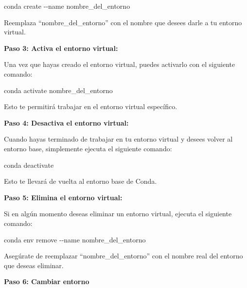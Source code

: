 \documentclass[
  jou,
  floatsintext,
  longtable,
  a4paper,
  nolmodern,
  notxfonts,
  notimes,
  colorlinks=true,linkcolor=blue,citecolor=blue,urlcolor=blue]{apa7}
\newenvironment{Shaded}{\begin{snugshade}}{\end{snugshade}}
\newcommand{\AttributeTok}[1]{\textcolor[rgb]{0.40,0.45,0.13}{#1}}
\newcommand{\ExtensionTok}[1]{\textcolor[rgb]{0.00,0.23,0.31}{#1}}
\newcommand{\NormalTok}[1]{\textcolor[rgb]{0.00,0.23,0.31}{#1}}
\begin{document}
\begin{Shaded}
\begin{Highlighting}[]
\ExtensionTok{conda}\NormalTok{ create }\AttributeTok{{-}{-}name}\NormalTok{ nombre\_del\_entorno}
\end{Highlighting}
\end{Shaded}

Reemplaza ``nombre\_del\_entorno'' con el nombre que desees darle a tu
entorno virtual.

\textbf{Paso 3: Activa el entorno virtual:}

Una vez que hayas creado el entorno virtual, puedes activarlo con el
siguiente comando:

\begin{Shaded}
\begin{Highlighting}[]
\ExtensionTok{conda}\NormalTok{ activate nombre\_del\_entorno}
\end{Highlighting}
\end{Shaded}

Esto te permitirá trabajar en el entorno virtual específico.

\textbf{Paso 4: Desactiva el entorno virtual:}

Cuando hayas terminado de trabajar en tu entorno virtual y desees volver
al entorno base, simplemente ejecuta el siguiente comando:

\begin{Shaded}
\begin{Highlighting}[]
\ExtensionTok{conda}\NormalTok{ deactivate}
\end{Highlighting}
\end{Shaded}

Esto te llevará de vuelta al entorno base de Conda.

\textbf{Paso 5: Elimina el entorno virtual:}

Si en algún momento deseas eliminar un entorno virtual, ejecuta el
siguiente comando:

\begin{Shaded}
\begin{Highlighting}[]
\ExtensionTok{conda}\NormalTok{ env remove }\AttributeTok{{-}{-}name}\NormalTok{ nombre\_del\_entorno}
\end{Highlighting}
\end{Shaded}

Asegúrate de reemplazar ``nombre\_del\_entorno'' con el nombre real del
entorno que deseas eliminar.

\textbf{Paso 6: Cambiar entorno}
\end{document}
